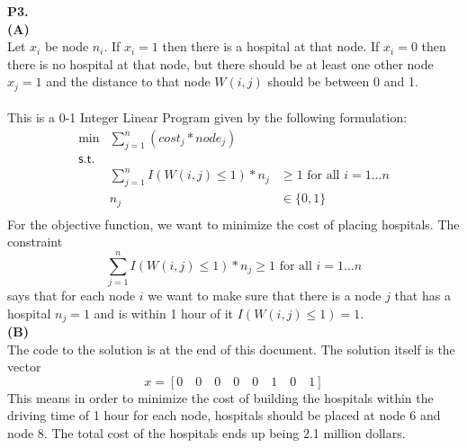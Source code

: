 \documentclass[11pt]{article}
\begin{document}
\medskip

\newpage
\noindent\textbf{P3.}
\\
\noindent\textbf{(A)}
\\
Let $x_i$ be node $n_i$.  If $x_i = 1$ then there is a hospital at that node.  If $x_i = 0$ then there is no hospital at that node, but there should be at least one other node $x_j = 1$ and the distance to that node $W(i,j)$ should be between 0 and 1.\\ \\
This is a 0-1 Integer Linear Program given by the following formulation:
\[\begin{array}{rlllllllll}
\min & \sum_{j=1}^{n} (cost_j*node_j) \\
\mathsf{s.t. } \\
& \sum_{j=1}^{n} I(W(i,j) \leq 1)*n_j & \geq 1 \text{ for all }i = 1...n\\
& n_j & \in \{0,1\} \\
\end{array}\]
For the objective function, we want to minimize the cost of placing hospitals.
The constraint
$$
\sum_{j=1}^{n} I(W(i,j) \leq 1)*n_j \geq 1 \text{ for all }i = 1...n
$$
says that for each node $i$ we want to make sure that there is a node $j$ that has a hospital $n_j = 1$ and is within 1 hour of it $I(W(i,j) \leq 1) = 1$. \\

\noindent\textbf{(B)}
\\
The code to the solution is at the end of this document.  The solution itself is the vector 
$$x = [0\quad0\quad0\quad0\quad0\quad1\quad0\quad1]$$
This means in order to minimize the cost of building the hospitals within the driving time of 1 hour for each node, hospitals should be placed at node 6 and node 8.  The total cost of the hospitals ends up being 2.1 million dollars.  
\end{document}
